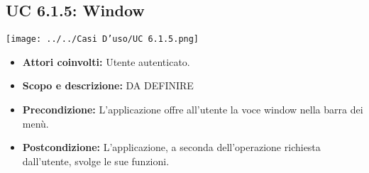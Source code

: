 \subsection{UC 6.1.5: Window}
		\texttt{[image: ../../Casi D'uso/UC 6.1.5.png]}
\begin{itemize}
		\item \textbf{Attori coinvolti:} Utente autenticato. \\
		\item \textbf{Scopo e descrizione:} DA DEFINIRE \\
		\item \textbf{Precondizione:} L'applicazione offre all'utente la voce window nella barra dei menù. \\
		\item \textbf{Postcondizione:} L'applicazione, a seconda dell'operazione richiesta dall'utente, svolge le sue funzioni. \\
\end{itemize}